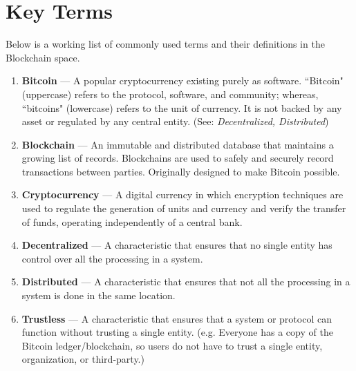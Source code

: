 \documentclass[full.tex]{subfiles}
\begin{document}
    \section*{Key Terms}
    \noindent Below is a working list of commonly used terms and their definitions in the Blockchain space.
    \begin{enumerate}
        \item \textbf{Bitcoin} --- A popular cryptocurrency existing purely as software. ``Bitcoin" (uppercase) refers to the protocol, software, and community; whereas, ``bitcoins" (lowercase) refers to the unit of currency. It is not backed by any asset or regulated by any central entity. (See: \textit{Decentralized, Distributed})
        \item \textbf{Blockchain} --- An immutable and distributed database that maintains a growing list of records. Blockchains are used to safely and securely record transactions between parties. Originally designed to make Bitcoin possible.
        \item \textbf{Cryptocurrency} --- A digital currency in which encryption techniques are used to regulate the generation of units and currency and verify the transfer of funds, operating independently of a central bank.
        \item \textbf{Decentralized} --- A characteristic that ensures that no single entity has control over all the processing in a system.
        \item \textbf{Distributed} --- A characteristic that ensures that not all the processing in a system is done in the same location.
        \item \textbf{Trustless} --- A characteristic that ensures that a system or protocol can function without trusting a single entity. (e.g. Everyone has a copy of the Bitcoin ledger/blockchain, so users do not have to trust a single entity, organization, or third-party.)
        
    \end{enumerate}
\end{document}
